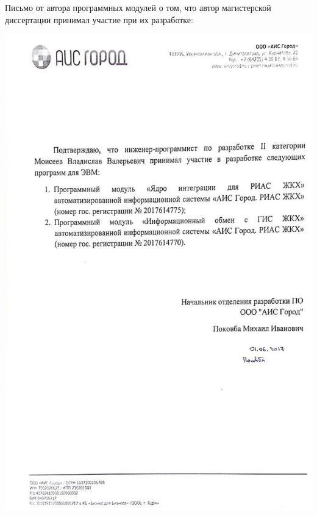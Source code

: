 \newpage
Письмо от автора программных модулей о том, что автор магистерской диссертации принимал участие при их разработке:

\begin{minipage}[h]{\linewidth}
	\includegraphics[width=0.7\linewidth]{images/aprob-letter}
\end{minipage}
